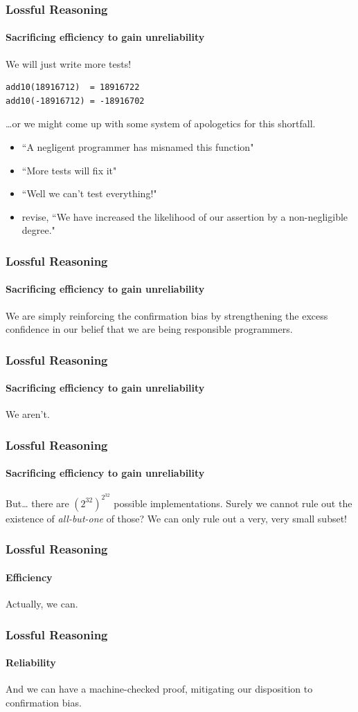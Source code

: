 \begin{frame}[fragile]
\frametitle{Lossful Reasoning}
\framesubtitle{Sacrificing efficiency to gain unreliability}
We will just write more tests!
\begin{lstlisting}[style=scala]
add10(18916712)  = 18916722
add10(-18916712) = -18916702
\end{lstlisting}
\ldots or we might come up with some system of apologetics for this shortfall.
\begin{itemize}
  \item ``A negligent programmer has misnamed this function"
  \item ``More tests will fix it"
  \item ``Well we can't test everything!"
  \item revise, ``We have increased the likelihood of our assertion by a non-negligible degree."
\end{itemize}
\end{frame}

\begin{frame}[fragile]
\frametitle{Lossful Reasoning}
\framesubtitle{Sacrificing efficiency to gain unreliability}
\begin{center}{We are simply reinforcing the confirmation bias by strengthening 
the excess confidence in our belief that we are being responsible programmers.}
\end{center}
\end{frame}

\begin{frame}[fragile]
\frametitle{Lossful Reasoning}
\framesubtitle{Sacrificing efficiency to gain unreliability}
\begin{center}
We aren't.
\end{center}
\end{frame}

\begin{frame}[fragile]
\frametitle{Lossful Reasoning}
\framesubtitle{Sacrificing efficiency to gain unreliability}
\begin{block}{But\ldots}
there are {$({2^{32}})^{2^{32}}$} possible implementations. Surely we cannot 
rule out the existence of \emph{all-but-one} of those? We can only rule out a
\scriptsize{very, very} \tiny{small subset}!
\end{block}
\end{frame}

\begin{frame}[fragile]
\frametitle{Lossful Reasoning}
\framesubtitle{Efficiency}
\begin{center}
Actually, we can.
\end{center}
\end{frame}

\begin{frame}[fragile]
\frametitle{Lossful Reasoning}
\framesubtitle{Reliability}
\begin{center}
And we can have a machine-checked proof, mitigating our disposition to
confirmation bias.
\end{center}
\end{frame}
